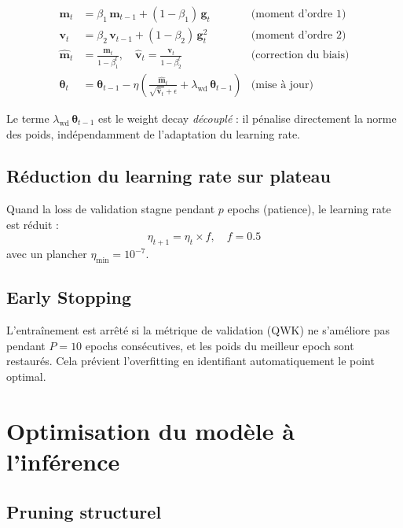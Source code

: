 \documentclass[11pt,a4paper]{article}
\begin{document}
\begin{align}
  \mathbf{m}_t &= \beta_1\,\mathbf{m}_{t-1} + (1 - \beta_1)\,\mathbf{g}_t & \text{(moment d'ordre 1)} \\
  \mathbf{v}_t &= \beta_2\,\mathbf{v}_{t-1} + (1 - \beta_2)\,\mathbf{g}_t^2 & \text{(moment d'ordre 2)} \\
  \hat{\mathbf{m}}_t &= \frac{\mathbf{m}_t}{1 - \beta_1^t}, \quad \hat{\mathbf{v}}_t = \frac{\mathbf{v}_t}{1 - \beta_2^t} & \text{(correction du biais)} \\[6pt]
  \bm{\theta}_t &= \bm{\theta}_{t-1} - \eta\!\left(\frac{\hat{\mathbf{m}}_t}{\sqrt{\hat{\mathbf{v}}_t} + \epsilon} + \lambda_{\text{wd}}\,\bm{\theta}_{t-1}\right) & \text{(mise à jour)}
\end{align}

Le terme $\lambda_{\text{wd}}\,\bm{\theta}_{t-1}$ est le weight decay \emph{découplé} : il pénalise directement la norme des poids, indépendamment de l'adaptation du learning rate.

\subsection{Réduction du learning rate sur plateau}

Quand la loss de validation stagne pendant $p$ epochs (patience), le learning rate est réduit :
\begin{equation}
  \eta_{t+1} = \eta_t \times f, \quad f = 0.5
\end{equation}
avec un plancher $\eta_{\min} = 10^{-7}$.

\subsection{Early Stopping}

L'entraînement est arrêté si la métrique de validation (QWK) ne s'améliore pas pendant $P = 10$ epochs consécutives, et les poids du meilleur epoch sont restaurés. Cela prévient l'overfitting en identifiant automatiquement le point optimal.

\section{Optimisation du modèle à l'inférence}

\subsection{Pruning structurel}
\end{document}
